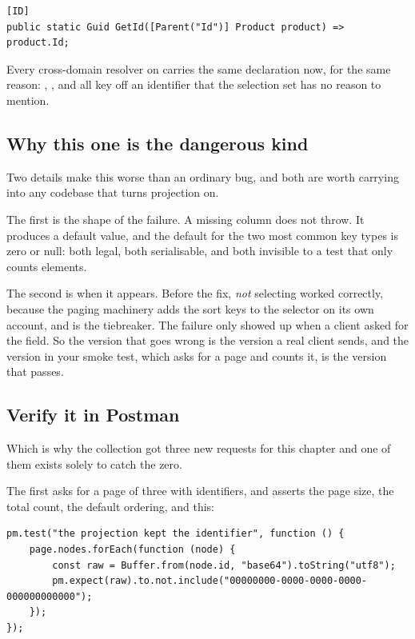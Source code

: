 \begin{verbatim}
[ID]
public static Guid GetId([Parent("Id")] Product product) => product.Id;
\end{verbatim}

Every cross-domain resolver on  carries the same declaration now,
for the same reason: , ,  and
 all key off an identifier that the selection set has no
reason to mention.

\subsection*{Why this one is the dangerous kind}

%
Two details make this worse than an ordinary bug, and both are worth carrying
into any codebase that turns projection on.

The first is the shape of the failure. A missing column does not throw. It
produces a default value, and the default for the two most common key types is
zero or null: both legal, both serialisable, and both invisible to a test that
only counts elements.

The second is when it appears. Before the fix, \emph{not} selecting 
worked correctly, because the paging machinery adds the sort keys to the
selector on its own account, and  is the tiebreaker. The failure only
showed up when a client asked for the field. So the version that goes wrong is
the version a real client sends, and the version in your smoke test, which asks
for a page and counts it, is the version that passes.

\subsection*{Verify it in Postman}

%
Which is why the collection got three new requests for this chapter and one of
them exists solely to catch the zero.

The first asks for a page of three with identifiers, and asserts the page size,
the total count, the default ordering, and this:

\begin{verbatim}
pm.test("the projection kept the identifier", function () {
    page.nodes.forEach(function (node) {
        const raw = Buffer.from(node.id, "base64").toString("utf8");
        pm.expect(raw).to.not.include("00000000-0000-0000-0000-000000000000");
    });
});
\end{verbatim}

